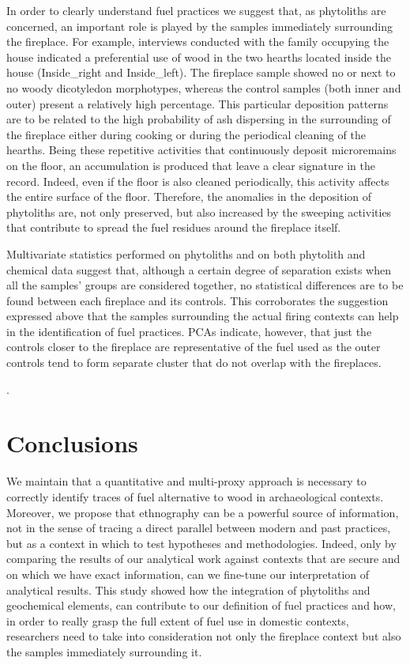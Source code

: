 \documentclass[authoryear,preprint,review,12pt]{elsarticle}
\begin{document}
In order to clearly understand fuel practices we suggest that, as phytoliths are concerned, an important role is played by the samples immediately surrounding the fireplace. For example, interviews conducted with the family occupying the house indicated a preferential use of wood in the two hearths located inside the house (Inside\_right and Inside\_left). The fireplace sample showed no or next to no woody dicotyledon morphotypes, whereas the control samples (both inner and outer) present a relatively high percentage. This particular deposition patterns are to be related to the high probability of ash dispersing in the surrounding of the fireplace either during cooking or during the periodical cleaning of the hearths. Being these repetitive activities that continuously deposit microremains on the floor, an accumulation is produced that leave a clear signature in the record. Indeed, even if the floor is also cleaned periodically, this activity affects the entire surface of the floor. Therefore, the anomalies in the deposition of phytoliths are, not only preserved, but also increased by the sweeping activities that contribute to spread the fuel residues around the fireplace itself.\par
Multivariate statistics performed on phytoliths and on both phytolith and chemical data suggest that, although a certain degree of separation exists when all the samples' groups are considered together, no statistical differences are to be found between each fireplace and its controls. This corroborates the suggestion expressed above that the samples surrounding the actual firing contexts can help in the identification of fuel practices. PCAs indicate, however, that just the controls closer to the fireplace are representative of the fuel used as the outer controls tend to form separate cluster that do not overlap with the fireplaces.\par
{}.


\section{Conclusions}
\label{sec:5}
We maintain that a quantitative and multi-proxy approach is necessary to correctly identify traces of fuel alternative to wood in archaeological contexts. Moreover, we propose that ethnography can be a powerful source of information, not in the sense of tracing a direct parallel between modern and past practices, but as a context in which to test hypotheses and methodologies. Indeed, only by comparing the results of our analytical work against contexts that are secure and on which we have exact information, can we fine-tune our interpretation of analytical results. This study showed how the integration of phytoliths and geochemical elements, can contribute to our definition of fuel practices and how, in order to really grasp the full extent of fuel use in domestic contexts, researchers need to take into consideration not only the fireplace context but also the samples immediately surrounding it.
\end{document}
